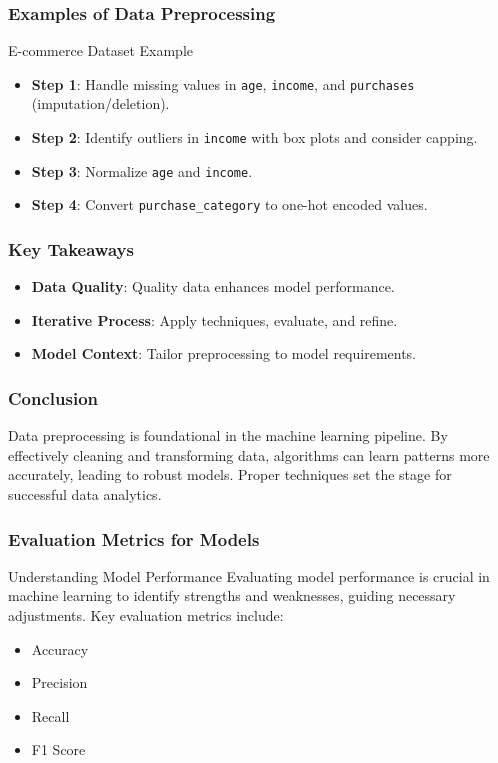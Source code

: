 \documentclass[aspectratio=169]{beamer}
\begin{document}
\begin{frame}[fragile]
    \frametitle{Examples of Data Preprocessing}
    \begin{block}{E-commerce Dataset Example}
        \begin{itemize}
            \item \textbf{Step 1}: Handle missing values in \texttt{age}, \texttt{income}, and \texttt{purchases} (imputation/deletion).
            \item \textbf{Step 2}: Identify outliers in \texttt{income} with box plots and consider capping.
            \item \textbf{Step 3}: Normalize \texttt{age} and \texttt{income}.
            \item \textbf{Step 4}: Convert \texttt{purchase\_category} to one-hot encoded values.
        \end{itemize}
    \end{block}
\end{frame}

\begin{frame}[fragile]
    \frametitle{Key Takeaways}
    \begin{itemize}
        \item \textbf{Data Quality}: Quality data enhances model performance.
        \item \textbf{Iterative Process}: Apply techniques, evaluate, and refine.
        \item \textbf{Model Context}: Tailor preprocessing to model requirements.
    \end{itemize}
\end{frame}

\begin{frame}[fragile]
    \frametitle{Conclusion}
    Data preprocessing is foundational in the machine learning pipeline. By effectively cleaning and transforming data, algorithms can learn patterns more accurately, leading to robust models. Proper techniques set the stage for successful data analytics.
\end{frame}

\begin{frame}[fragile]
    \frametitle{Evaluation Metrics for Models}
    \begin{block}{Understanding Model Performance}
        Evaluating model performance is crucial in machine learning to identify strengths and weaknesses, guiding necessary adjustments. Key evaluation metrics include:
        \begin{itemize}
            \item Accuracy
            \item Precision
            \item Recall
            \item F1 Score
        \end{itemize}
    \end{block}
\end{frame}
\end{document}
